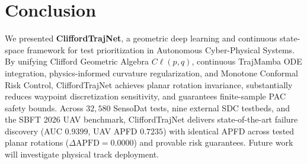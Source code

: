 \section{Conclusion}
\label{sec:conclusion}

We presented \textbf{CliffordTrajNet}, a geometric deep learning and continuous state-space framework for test prioritization in Autonomous Cyber-Physical Systems. By unifying Clifford Geometric Algebra $C\ell(p,q)$, continuous TrajMamba ODE integration, physics-informed curvature regularization, and Monotone Conformal Risk Control, CliffordTrajNet achieves planar rotation invariance, substantially reduces waypoint discretization sensitivity, and guarantees finite-sample PAC safety bounds. Across $32{,}580$ SensoDat tests, nine external SDC testbeds, and the SBFT 2026 UAV benchmark, CliffordTrajNet delivers state-of-the-art failure discovery (AUC $0.9399$, UAV APFD $0.7235$) with identical APFD across tested planar rotations ($\Delta\mathrm{APFD} = 0.0000$) and provable risk guarantees. Future work will investigate physical track deployment.

